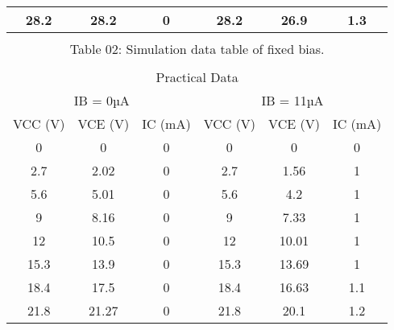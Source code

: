 \documentclass[a4paper, 12pt]{extarticle}
\begin{document}
\begin{table}[htbp]
\begin{tabular}{cccccc}
    \midrule
    \multicolumn{1}{|c|}{28.2} & \multicolumn{1}{c|}{28.2} & \multicolumn{1}{c|}{0} & \multicolumn{1}{c|}{28.2} & \multicolumn{1}{c|}{26.9} & \multicolumn{1}{c|}{1.3} \\
    \midrule
          &       &       &       &       &  \\
    \multicolumn{6}{c}{Table 02: Simulation data table of fixed bias.} \\
          &       &       &       &       &  \\
    \midrule
    \multicolumn{6}{|c|}{Practical Data} \\
    \midrule
    \multicolumn{3}{|c|}{IB = 0µA} & \multicolumn{3}{c|}{IB = 11µA} \\
    \midrule
    \multicolumn{1}{|c|}{VCC (V)} & \multicolumn{1}{c|}{VCE (V)} & \multicolumn{1}{c|}{IC (mA)} & \multicolumn{1}{c|}{VCC (V)} & \multicolumn{1}{c|}{VCE (V)} & \multicolumn{1}{c|}{IC (mA)} \\
    \midrule
    \multicolumn{1}{|c|}{0} & \multicolumn{1}{c|}{0} & \multicolumn{1}{c|}{0} & \multicolumn{1}{c|}{0} & \multicolumn{1}{c|}{0} & \multicolumn{1}{c|}{0} \\
    \midrule
    \multicolumn{1}{|c|}{2.7} & \multicolumn{1}{c|}{2.02} & \multicolumn{1}{c|}{0} & \multicolumn{1}{c|}{2.7} & \multicolumn{1}{c|}{1.56} & \multicolumn{1}{c|}{1} \\
    \midrule
    \multicolumn{1}{|c|}{5.6} & \multicolumn{1}{c|}{5.01} & \multicolumn{1}{c|}{0} & \multicolumn{1}{c|}{5.6} & \multicolumn{1}{c|}{4.2} & \multicolumn{1}{c|}{1} \\
    \midrule
    \multicolumn{1}{|c|}{9} & \multicolumn{1}{c|}{8.16} & \multicolumn{1}{c|}{0} & \multicolumn{1}{c|}{9} & \multicolumn{1}{c|}{7.33} & \multicolumn{1}{c|}{1} \\
    \midrule
    \multicolumn{1}{|c|}{12} & \multicolumn{1}{c|}{10.5} & \multicolumn{1}{c|}{0} & \multicolumn{1}{c|}{12} & \multicolumn{1}{c|}{10.01} & \multicolumn{1}{c|}{1} \\
    \midrule
    \multicolumn{1}{|c|}{15.3} & \multicolumn{1}{c|}{13.9} & \multicolumn{1}{c|}{0} & \multicolumn{1}{c|}{15.3} & \multicolumn{1}{c|}{13.69} & \multicolumn{1}{c|}{1} \\
    \midrule
    \multicolumn{1}{|c|}{18.4} & \multicolumn{1}{c|}{17.5} & \multicolumn{1}{c|}{0} & \multicolumn{1}{c|}{18.4} & \multicolumn{1}{c|}{16.63} & \multicolumn{1}{c|}{1.1} \\
    \midrule
    \multicolumn{1}{|c|}{21.8} & \multicolumn{1}{c|}{21.27} & \multicolumn{1}{c|}{0} & \multicolumn{1}{c|}{21.8} & \multicolumn{1}{c|}{20.1} & \multicolumn{1}{c|}{1.2} \\

\end{tabular}
\end{table}
\end{document}
